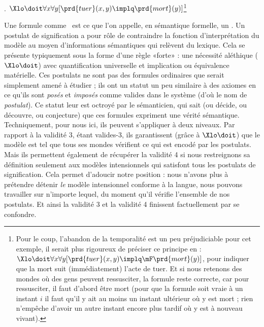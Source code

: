 \newpage

\ex.
\(\Xlo\doit\forall x\forall y[\prd{tuer}(x,y)\implq \prd{mort}(y)]\)\footnote{Pour le coup, l'abandon de la temporalité est un peu préjudiciable pour cet exemple, il serait plus rigoureux de préciser ce principe en : \(\Xlo\doit\forall x\forall y[\prd{tuer}(x,y)\implq \mF\prd{mort}(y)]\), pour indiquer que la mort suit (immédiatement) l'acte de tuer.  Et si nous retenons des mondes où des gens peuvent ressusciter, la formule reste correcte, car pour ressusciter, il faut d'abord être mort (pour que la formule soit vraie à un instant $i$ il faut qu'il y ait au moins un instant ultérieur où \vrb y est mort ; rien n'empêche d'avoir un autre instant encore plus tardif où \vrb y est à nouveau vivant).}


\sloppy

Une formule comme \Last\ est ce que l'on appelle, en sémantique formelle, un . 
Un postulat de signification a pour rôle de contraindre la fonction d'interprétation du modèle %
au moyen d'informations
sémantiques qui relèvent du lexique. 
Cela se présente typiquement sous la forme d'une %
règle
{«forte»} : une nécessité aléthique ($\Xlo\doit$) avec quantification universelle et implication ou équivalence matérielle. %
Ces postulats ne sont pas des formules ordinaires que {\LO} serait simplement amené à étudier ; ils ont un statut un peu similaire à des axiomes en ce qu'ils sont \emph{posés} et \emph{imposés} comme valides dans le système (d'où le nom de \emph{postulat}). 
Ce statut leur est octroyé par le sémanticien, qui sait (ou décide, ou découvre, ou conjecture) que ces formules expriment une vérité sémantique.  
Techniquement, pour nous ici, ils peuvent s'appliquer à deux niveaux. 
Par rapport à la validité 3, étant valides-3, ils garantissent (grâce à $\Xlo\doit$) que le modèle est tel que tous ses mondes vérifient ce qui est encodé par les postulats.  Mais ils permettent également de récupérer la validité 4 si nous restreignons sa définition seulement aux modèles intensionnels qui satisfont tous les postulats de signification.  Cela permet d'adoucir notre position : nous n'avons plus à prétendre détenir \emph{le} modèle intensionnel conforme à la langue, nous pouvons travailler sur n'importe lequel, du moment qu'il vérifie l'ensemble de nos postulats.
Et ainsi la validité 3 et la validité 4 finissent factuellement par se confondre.

\fussy

